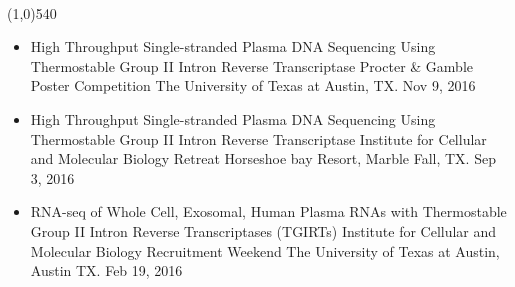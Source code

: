 \documentclass[dvips,11pt]{article}
\begin{document}
 \vspace{-1.5mm}
\\\noindent
\line(1,0){540}\\
\vspace{-6mm}
\begin{itemize}
	\setlength{\itemsep}{0pt}
	\item High Throughput Single-stranded Plasma DNA Sequencing Using Thermostable Group II Intron Reverse Transcriptase \newline
	 	Procter \& Gamble Poster Competition \newline
		The University of Texas at Austin, TX. Nov 9, 2016
	\item High Throughput Single-stranded Plasma DNA Sequencing Using Thermostable Group II Intron Reverse Transcriptase \newline
		Institute for Cellular and Molecular Biology Retreat \newline
		Horseshoe bay Resort, Marble Fall, TX. Sep 3, 2016
	\item RNA-seq of Whole Cell, Exosomal, Human Plasma RNAs with Thermostable Group II Intron Reverse Transcriptases (TGIRTs) \newline
		Institute for Cellular and Molecular Biology Recruitment Weekend \newline
		The University of Texas at Austin, Austin TX. Feb 19, 2016
\end{itemize}


\end{document}
